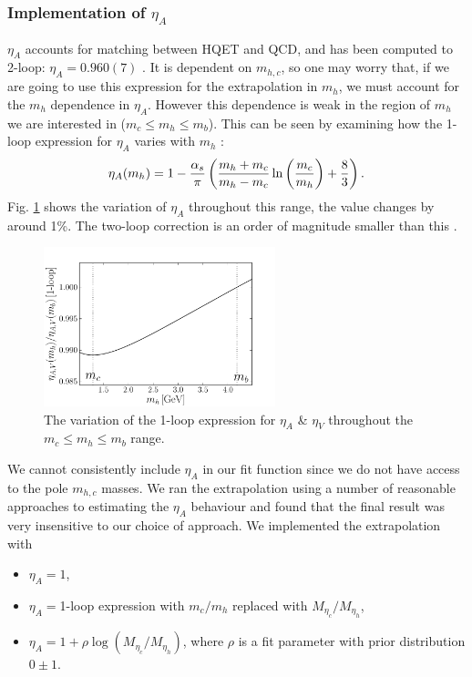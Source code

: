 \subsubsection{Implementation of $\eta_A$}

$\eta_A$ accounts for matching between HQET and QCD, and has been computed to 2-loop: $\eta_A = 0.960(7)$ \cite{PhysRevLett.76.4124}. It is dependent on $m_{h,c}$, so one may worry that, if we are going to use this expression for the extrapolation in $m_h$, we must account for the $m_h$ dependence in $\eta_A$. However this dependence is weak in the region of $m_h$ we are interested in ($m_c \leq m_h \leq m_b$). This can be seen by examining how the 1-loop expression for $\eta_A$ varies with $m_h$ \cite{CLOSE1984209}:
\begin{align}
  \eta_A(m_h) = 1 - {\alpha_s \over \pi} \left( {m_h+m_c\over m_h-m_c} \ln\left({m_c\over m_h}\right) + {8\over 3} \right).
  \label{eq:etaA}
\end{align}
Fig. \ref{fig:etaAV} shows the variation of $\eta_A$ throughout this range, the value changes by around 1\%. The two-loop correction is an order of magnitude smaller than this \cite{PhysRevLett.76.4124}.

\begin{figure}[htb!]
  \begin{center}
  \includegraphics[width=0.6\textwidth]{images/BsDsstar/etaAV.pdf}
  \caption{The variation of the 1-loop expression for $\eta_{A}$ \& $\eta_V$ throughout the $m_c \leq m_h \leq m_b$ range. \label{fig:etaAV}}
  \end{center}
  \vspace{-10pt}
\end{figure}

We cannot consistently include $\eta_A$ in our fit function since we do not have access to the pole $m_{h,c}$ masses. We ran the extrapolation using a number of reasonable approaches to estimating the $\eta_A$ behaviour and found that the final result was very insensitive to our choice of approach. We implemented the extrapolation with
\begin{itemize}
\item
  $\eta_A=1$,
\item
  $\eta_A = $1-loop expression with $m_c/m_h$ replaced with $M_{\eta_c}/M_{\eta_h}$,
\item
  $\eta_A = 1 + \rho \log(M_{\eta_c}/M_{\eta_h})$, where $\rho$ is a fit parameter with prior distribution $0\pm 1$.
\end{itemize}

